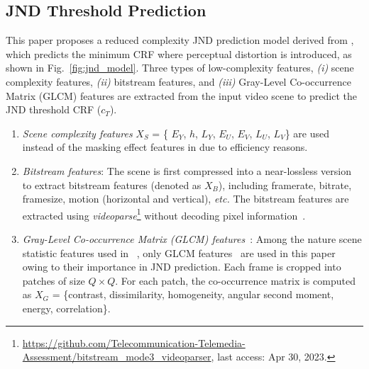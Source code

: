 \documentclass{article}
\newcommand{\cf}{\emph{cf.}\xspace}
\newcommand{\etc}{\emph{etc. }}
\begin{document}
\subsection{JND Threshold Prediction}
\label{sec:vmaf_thresh}
\vspace{-0.22em}
This paper proposes a reduced complexity JND prediction model derived from \cite{zhu2022subjective}, which predicts the minimum CRF where perceptual distortion is introduced, as shown in Fig.~\ref{fig:jnd_model}. Three types of low-complexity features, \textit{(i)} scene complexity features, \textit{(ii)} bitstream features, and \textit{(iii)} Gray-Level Co-occurrence Matrix (GLCM) features are extracted from the input video scene to predict the JND threshold CRF ($c_T$). 
 \begin{enumerate}[label=\arabic*),leftmargin=*,nosep]
\item \textit{Scene complexity features} ${X_S}$ = \{ ${E_Y}$, $h$, ${L_Y}$, ${E_U}$, ${E_V}$, ${L_U}$, ${L_V}$\} are used instead of the masking effect features in \cite{zhu2022subjective} due to efficiency reasons. 
\item \textit{Bitstream features}\cite{bitstream_analyze_ref}: The scene is first compressed into a near-lossless version to extract bitstream features (denoted as $X_B$), including framerate, bitrate, framesize, motion (horizontal and vertical), \etc The bitstream features are extracted using \textit{videoparse}\footnote{\href{https://github.com/Telecommunication-Telemedia-Assessment/bitstream_mode3_videoparser}{https://github.com/Telecommunication-Telemedia-Assessment/bitstream\_mode3\_videoparser}, last access: Apr 30, 2023.} without decoding pixel information~\cite{bitstream_analyze_ref1}.
\item \textit{Gray-Level Co-occurrence Matrix (GLCM) features}~\cite{GLCM_ref}: Among the nature scene statistic features used in ~\cite{zhu2022subjective}, only GLCM features~\cite{GLCM_ref} are used in this paper owing to their importance in JND prediction. Each frame is cropped into patches of size $Q\times Q$. For each patch, the co-occurrence matrix is computed as ${X_{G}}$ = \{contrast, dissimilarity, homogeneity, angular second moment, energy, correlation\}.
 \end{enumerate}
\end{document}
